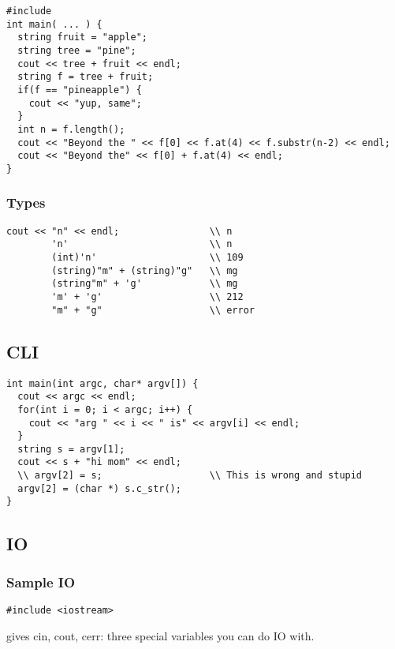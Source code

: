\documentclass[12pt]{article}
\begin{document}
\begin{verbatim}
#include
int main( ... ) {
  string fruit = "apple";
  string tree = "pine";
  cout << tree + fruit << endl;
  string f = tree + fruit;
  if(f == "pineapple") {
    cout << "yup, same";
  }
  int n = f.length();
  cout << "Beyond the " << f[0] << f.at(4) << f.substr(n-2) << endl;
  cout << "Beyond the" << f[0] + f.at(4) << endl;
}
\end{verbatim}

\subsubsection*{Types}
\begin{verbatim}
cout << "n" << endl;                \\ n
        'n'                         \\ n
        (int)'n'                    \\ 109
        (string)"m" + (string)"g"   \\ mg
        (string"m" + 'g'            \\ mg
        'm' + 'g'                   \\ 212
        "m" + "g"                   \\ error
\end{verbatim}

\subsection*{CLI}
\begin{verbatim}
int main(int argc, char* argv[]) {
  cout << argc << endl;
  for(int i = 0; i < argc; i++) {
    cout << "arg " << i << " is" << argv[i] << endl;
  }
  string s = argv[1];
  cout << s + "hi mom" << endl;
  \\ argv[2] = s;                   \\ This is wrong and stupid
  argv[2] = (char *) s.c_str();
}
\end{verbatim}

\subsection*{IO}
\subsubsection*{Sample IO}
\begin{verbatim}
#include <iostream>
\end{verbatim}
gives cin, cout, cerr: three special variables you can do IO with.
\end{document}
